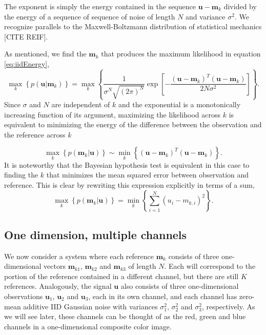 The exponent is simply the energy contained in the sequence $\mathbf{u}-\mathbf{m}_k$ divided by the
energy of a sequence of sequence of noise of length $N$ and variance $\sigma^2$. We recognize parallels to the Maxwell-Boltzmann distribution of statistical mechanics [CITE REIF].  

As mentioned, we find the $\mathbf{m}_k$ that produces the maximum likelihood in equation \ref{eq:iidEnergy},
\begin{equation}
\max_k   \left\{ p(\mathbf{u}|\mathbf{m}_k) \right\} =  \max_k  \left\{ \frac{1}{   \sigma^N\sqrt{ (2\pi)^N}  } \exp\left[ -\frac{(\mathbf{u}-\mathbf{m}_k)^T(\mathbf{u}-\mathbf{m}_k)} {2 N \sigma^2 } \right] \right\}. 
\end{equation}
Since $\sigma$ and $N$ are independent of $k$ and the exponential is a monotonically increasing function of its argument, maximizing the likelihood across $k$ is equivalent to minimizing the energy of the difference between the observation and the reference across $k$ 

\begin{equation}
\max_k   \left\{ p(\mathbf{m}_k|\mathbf{u}) \right\} \sim \min_k  \left\{ (\mathbf{u}-\mathbf{m}_k)^T(\mathbf{u}-\mathbf{m}_k) \right\}. 
\end{equation}
It is noteworthy that the Bayesian hypothesis test is equivalent in this case to finding the $k$ that minimizes the mean squared error between observation and reference. This is clear by rewriting this expression explicitly in terms of a sum,
\begin{equation}
\max_k   \left\{ p(\mathbf{m}_k|\mathbf{u}) \right\} =  \min_k  \left\{ \sum_{i=1}^N  (u_i-m_{k,i})^2   \right\}. 
\end{equation}

\subsection{One dimension, multiple channels}\label{sec:simpleModel}
We now consider a system where each reference $\mathbf{m}_k$ consists of three one-dimensional vectors $\mathbf{m}_{k1}$, $\mathbf{m}_{k2}$ and $\mathbf{m}_{k3}$ of length $N$. Each will correspond to the portion of the reference contained in a different channel, but there are still $K$ references. Analogously, the signal $\mathbf{u}$ also consists of three one-dimensional observations $\mathbf{u}_1$, $\mathbf{u}_2$ and $\mathbf{u}_3$, each in its own channel, and each channel has zero-mean additive IID Gaussian noise with variances $\sigma_1^2$, $\sigma_2^2$ and $\sigma_3^2$, respectively. As we will see later, these channels can be thought of as the red, green and blue channels in a one-dimensional composite color image. 

